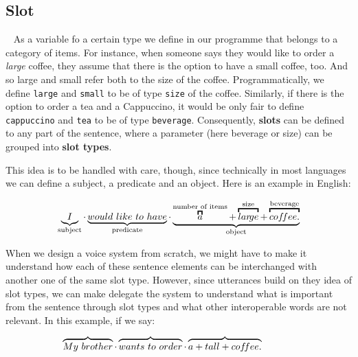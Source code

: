 	\subsection*{Slot}~\label{slots}
	As a variable fo a certain type we define in our programme that belongs to a category of items. For instance, when someone says they would like to order a \textit{large} coffee, they assume that there is the option to have a small coffee, too. And so large and small refer both to the size of the coffee. Programmatically, we define \texttt{large} and \texttt{small} to be of type \texttt{size} of the coffee. Similarly, if there is the option to order a tea and a Cappuccino, it would be only fair to define \texttt{cappuccino} and \texttt{tea} to be of type \texttt{beverage}. Consequently, \textbf{slots} can be defined to any part of the sentence, where a parameter (here beverage or size) can be grouped into \textbf{slot types}. 



	This idea is to be handled with care, though, since technically in most languages we can define a subject, a predicate and an object. Here is an example in English:
	
	\[
	\underbrace{I}_\text{subject} \cdot
	\underbrace{would \ like  \ to \ have}_\text{predicate} \cdot
	\underbrace{
		\overbracket{a}^\text{number of items} +		
		\overbracket{lar\!ge}^\text{size} +
		\overbracket{cof \mkern-3mu fee.}^\text{beverage}
	}_\text{object} 
	\]
	
	When we design a voice system from scratch, we might have to make it understand how each of these sentence elements can be interchanged with another one of the same slot type. However, since utterances build on they idea of slot types, we can make delegate the system to understand what is important from the sentence through slot types and what other interoperable words are not relevant. In this example, if we say:
	
	\[
	\overbrace{My \ brother} \cdot
	\overbrace{wants \ to \ order} \cdot
	\overbrace{ a + tall + cof\mkern-3mu fee.}
	\ \ \ \ \ \ \ \ \ \ 
	\]
	
